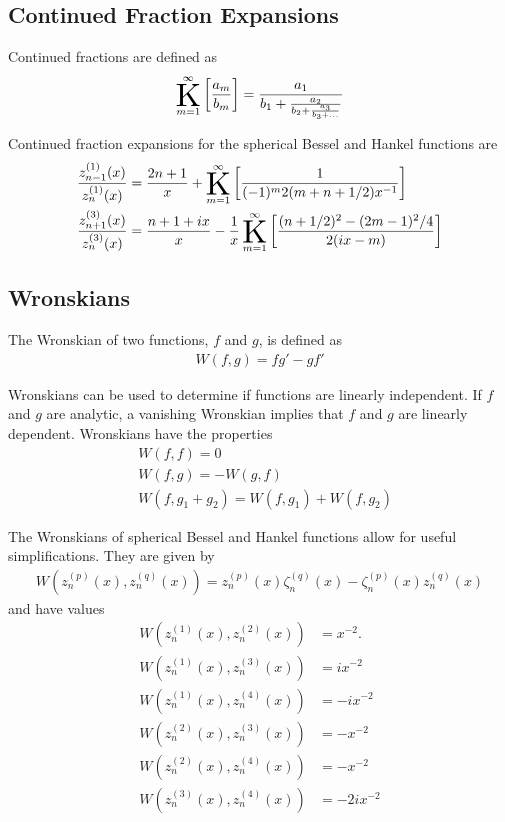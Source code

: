 \subsection{Continued Fraction Expansions}
%
Continued fractions are defined as
\begin{align}
\K_{m=1}^{\infty} \left[ \frac{a_{m}}{b_{m}} \right] = \frac{ a_{1} }{ b_{1} + \frac{ a_{2} }{ b_{2} + \frac{ a_{3} }{ b_{3} + \dotsc } } }
\end{align}

Continued fraction expansions for the spherical Bessel\cite{Lentz1976} and Hankel\cite{Cuyt2008} functions are
%
\begin{subequations}
\begin{align}
\frac{z_{n-1}^{(1)}(x)}{z_{n}^{(1)}(x)} &= \frac{2n+1}{x} + \K_{m=1}^{\infty} \left[ \frac{1}{(-1)^{m}2(m + n + 1/2)x^{-1}} \right]
\\
\frac{z_{n+1}^{(3)}(x)}{z_{n}^{(3)}(x)} &= \frac{n + 1 + ix}{x} - \frac{1}{x} \K_{m=1}^{\infty} \left[ \frac{(n+1/2)^{2} - (2m-1)^{2}/4}{2(ix-m)} \right]
\end{align}
\end{subequations}

\subsection{Wronskians}
The Wronskian of two functions, $f$ and $g$, is defined as
\begin{align}
W(f,g) = f g' - g f'
\end{align}

Wronskians can be used to determine if functions are linearly independent. If $f$ and $g$ are analytic, a vanishing Wronskian implies that $f$ and $g$ are linearly dependent. Wronskians have the properties
\begin{align}
& W(f,f) = 0
\\
& W(f,g) = - W(g,f)
\\
& W(f, g_{1} + g_{2}) = W(f,g_{1}) + W(f,g_{2})
\end{align}

The Wronskians of spherical Bessel and Hankel functions allow for useful simplifications. They are given by
\begin{align}
W(z_{n}^{(p)}(x), z_{n}^{(q)}(x)) = z_{n}^{(p)}(x) \zeta_{n}^{(q)}(x) - \zeta_{n}^{(p)}(x) z_{n}^{(q)}(x)
\end{align}
%
and have values\cite{Olver2017}
%
\begin{subequations}
\begin{align}
W(z_{n}^{(1)}(x), z_{n}^{(2)}(x)) &= x^{-2}.
\\
W(z_{n}^{(1)}(x), z_{n}^{(3)}(x)) &= i x^{-2}
\\
W(z_{n}^{(1)}(x), z_{n}^{(4)}(x)) &= -i x^{-2}
\\
W(z_{n}^{(2)}(x), z_{n}^{(3)}(x)) &= - x^{-2}
\\
W(z_{n}^{(2)}(x), z_{n}^{(4)}(x)) &= - x^{-2}
\\
W(z_{n}^{(3)}(x), z_{n}^{(4)}(x)) &= -2 i x^{-2}
\end{align}
\end{subequations}

